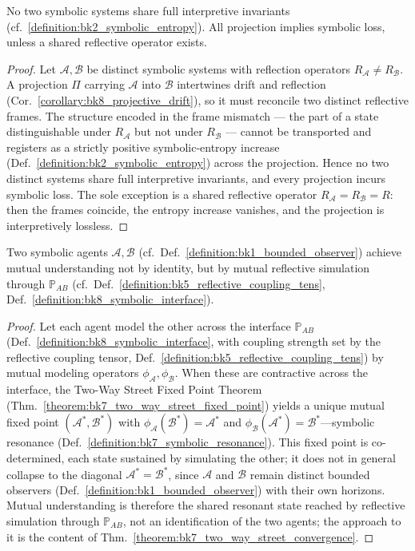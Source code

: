 \begin{corollary}
\label{corollary:bk8_translation_limit}
No two symbolic systems share full interpretive invariants (cf.~\ref{definition:bk2_symbolic_entropy}). All projection implies symbolic loss, unless a shared reflective operator exists.
\end{corollary}
\begin{proof}
\label{proof:bk8_translation_limit}
\leavevmode
Let $\mathscr{A},\mathscr{B}$ be distinct symbolic systems with reflection operators $R_{\mathcal A}\neq R_{\mathcal B}$. A projection $\Pi$ carrying $\mathscr{A}$ into $\mathscr{B}$ intertwines drift and reflection (Cor.~\ref{corollary:bk8_projective_drift}), so it must reconcile two distinct reflective frames. The structure encoded in the frame mismatch --- the part of a state distinguishable under $R_{\mathcal A}$ but not under $R_{\mathcal B}$ --- cannot be transported and registers as a strictly positive symbolic-entropy increase (Def.~\ref{definition:bk2_symbolic_entropy}) across the projection. Hence no two distinct systems share full interpretive invariants, and every projection incurs symbolic loss. The sole exception is a shared reflective operator $R_{\mathcal A}=R_{\mathcal B}=R$: then the frames coincide, the entropy increase vanishes, and the projection is interpretively lossless.
\end{proof}
\begin{corollary}
\label{corollary:bk8_resonant_cognition}
\leavevmode\newline
Two symbolic agents $\mathscr{A}, \mathscr{B}$
(cf.~Def.~\ref{definition:bk1_bounded_observer}) achieve mutual understanding
not by identity, but by mutual reflective simulation through $\mathbb{P}_{AB}$
(cf.~Def.~\ref{definition:bk5_reflective_coupling_tens}, Def.~\ref{definition:bk8_symbolic_interface}).
\end{corollary}
\begin{proof}
\label{proof:bk8_resonant_cognition}
\leavevmode
Let each agent model the other across the interface $\mathbb{P}_{AB}$
(Def.~\ref{definition:bk8_symbolic_interface}, with coupling strength set by the
reflective coupling tensor, Def.~\ref{definition:bk5_reflective_coupling_tens}) by
mutual modeling operators $\phi_{\mathscr{A}}, \phi_{\mathscr{B}}$. When these are
contractive across the interface, the Two-Way Street Fixed Point Theorem
(Thm.~\ref{theorem:bk7_two_way_street_fixed_point}) yields a unique mutual fixed
point $(\mathscr{A}^{*}, \mathscr{B}^{*})$ with
$\phi_{\mathscr{A}}(\mathscr{B}^{*}) = \mathscr{A}^{*}$ and
$\phi_{\mathscr{B}}(\mathscr{A}^{*}) = \mathscr{B}^{*}$---symbolic resonance
(Def.~\ref{definition:bk7_symbolic_resonance}). This fixed point is co-determined,
each state sustained by simulating the other; it does not in general collapse to the
diagonal $\mathscr{A}^{*} = \mathscr{B}^{*}$, since $\mathscr{A}$ and $\mathscr{B}$
remain distinct bounded observers (Def.~\ref{definition:bk1_bounded_observer}) with
their own horizons. Mutual understanding is therefore the shared resonant state
reached by reflective simulation through $\mathbb{P}_{AB}$, not an identification of
the two agents; the approach to it is the content of
Thm.~\ref{theorem:bk7_two_way_street_convergence}.
\end{proof}
